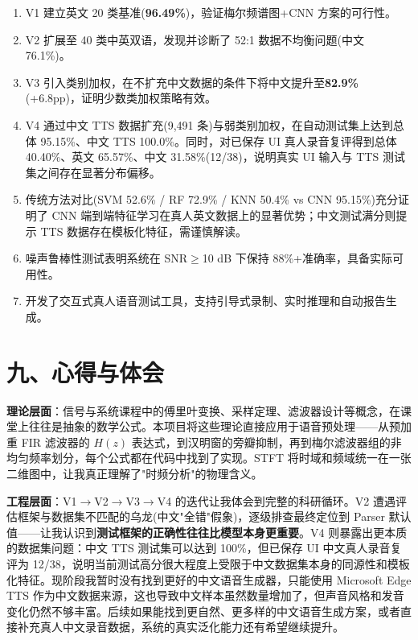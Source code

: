 ﻿\documentclass[12pt,a4paper]{article}
\begin{document}
\begin{enumerate}[leftmargin=*]
\item V1 建立英文 20 类基准(\textbf{96.49\%})，验证梅尔频谱图+CNN 方案的可行性。
\item V2 扩展至 40 类中英双语，发现并诊断了 52:1 数据不均衡问题(中文 76.1\%)。
\item V3 引入类别加权，在不扩充中文数据的条件下将中文提升至\textbf{82.9\%}(+6.8pp)，证明少数类加权策略有效。
\item V4 通过中文 TTS 数据扩充(9,491 条)与弱类别加权，在自动测试集上达到总体 95.15\%、中文 TTS 100.0\%。同时，对已保存 UI 真人录音复评得到总体 40.40\%、英文 65.57\%、中文 31.58\%(12/38)，说明真实 UI 输入与 TTS 测试集之间存在显著分布偏移。
\item 传统方法对比(SVM 52.6\% / RF 72.9\% / KNN 50.4\% vs CNN 95.15\%)充分证明了 CNN 端到端特征学习在真人英文数据上的显著优势；中文测试满分则提示 TTS 数据存在模板化特征，需谨慎解读。
\item 噪声鲁棒性测试表明系统在 SNR$\ge$10 dB 下保持 88\%+准确率，具备实际可用性。
\item 开发了交互式真人语音测试工具，支持引导式录制、实时推理和自动报告生成。
\end{enumerate}


\section*{九、心得与体会}

\textbf{理论层面}：信号与系统课程中的傅里叶变换、采样定理、滤波器设计等概念，在课堂上往往是抽象的数学公式。本项目将这些理论直接应用于语音预处理——从预加重 FIR 滤波器的 $H(z)$ 表达式，到汉明窗的旁瓣抑制，再到梅尔滤波器组的非均匀频率划分，每个公式都在代码中找到了实现。STFT 将时域和频域统一在一张二维图中，让我真正理解了"时频分析"的物理含义。

\textbf{工程层面}：V1$\to$V2$\to$V3$\to$V4 的迭代让我体会到完整的科研循环。V2 遭遇评估框架与数据集不匹配的乌龙(中文"全错"假象)，逐级排查最终定位到 Parser 默认值——让我认识到\textbf{测试框架的正确性往往比模型本身更重要}。V4 则暴露出更本质的数据集问题：中文 TTS 测试集可以达到 100\%，但已保存 UI 中文真人录音复评为 12/38，说明当前测试高分很大程度上受限于中文数据集本身的同源性和模板化特征。现阶段我暂时没有找到更好的中文语音生成器，只能使用 Microsoft Edge TTS 作为中文数据来源，这也导致中文样本虽然数量增加了，但声音风格和发音变化仍然不够丰富。后续如果能找到更自然、更多样的中文语音生成方案，或者直接补充真人中文录音数据，系统的真实泛化能力还有希望继续提升。
\end{document}
